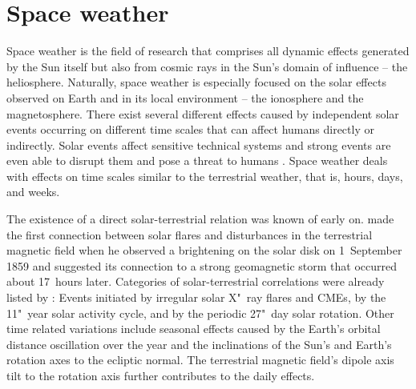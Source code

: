 



\section{Space weather}
\label{sec:space_weather}
Space weather is the field of research that comprises all dynamic effects generated by the Sun itself but also from cosmic rays in
the Sun's domain of influence -- the heliosphere. Naturally, space weather is especially focused on the solar effects observed on Earth and in its local environment -- the ionosphere and the magnetosphere. There exist several different effects caused by independent solar events occurring on different time scales that can affect humans directly or indirectly. Solar events affect sensitive technical systems and strong events are even able to disrupt them and pose a threat to humans \citep{Bothmer2007}. Space weather deals with effects on time scales similar to the terrestrial weather, that is, hours, days, and weeks.

The existence of a direct solar-terrestrial relation was known of early on. \citet{Carrington1859} made the first connection between solar flares and disturbances in the terrestrial magnetic field when he observed a brightening on the solar disk on 1~September 1859 and suggested its connection to a strong geomagnetic storm that occurred about 17~hours later. Categories of solar-terrestrial correlations were already listed by \citet{Bartels1962}: Events initiated by irregular solar X"~ray flares and CMEs, by the 11"~year solar activity cycle, and by the periodic 27"~day solar rotation. Other time related variations include seasonal effects caused by the Earth's orbital distance oscillation over the year and the inclinations of the Sun's and Earth's rotation axes to the ecliptic normal. The terrestrial magnetic field's dipole axis tilt to the rotation axis further contributes to the daily effects.

